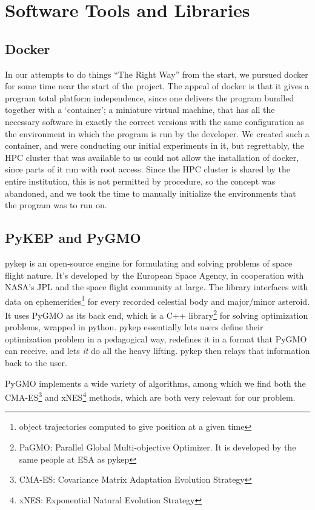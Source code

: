 \chapter{Software Tools and Libraries} \label{apx:software}

\section{Docker}

In our attempts to do things ``The Right Way'' from the start, we pursued docker for some time near the start of the project. The appeal of docker is that it gives a program total platform independence, since one delivers the program bundled together with a `container'; a miniature virtual machine, that has all the necessary software in exactly the correct versions with the same configuration as the environment in which the program is run by the developer. We created such a container, and were conducting our initial experiments in it, but regrettably, the HPC cluster that was available to us could not allow the installation of docker, since parts of it run with root access. Since the HPC cluster is shared by the entire institution, this is not permitted by procedure, so the concept was abandoned, and we took the time to manually initialize the environments that the program was to run on.

\section{PyKEP and PyGMO}

pykep is an open-source engine for formulating and solving problems of space flight nature. It's developed by the European Space Agency, in cooperation with NASA's JPL and the space flight community at large. The library interfaces with data on ephemerides\footnote{object trajectories computed to give position at a given time} for every recorded celestial body and major/minor asteroid. It uses PyGMO as its back end, which is a C++ library\footnote{PaGMO: Parallel Global Multi-objective Optimizer. It is developed by the same people at ESA as pykep} for solving optimization problems, wrapped in python. pykep essentially lets users define their optimization problem in a pedagogical way, redefines it in a format that PyGMO can receive, and lets \emph{it} do all the heavy lifting. pykep then relays that information back to the user.

PyGMO implements a wide variety of algorithms, among which we find both the CMA-ES\footnote{CMA-ES: Covariance Matrix Adaptation Evolution Strategy} and xNES\footnote{xNES: Exponential Natural Evolution Strategy} methods, which are both very relevant for our problem.

